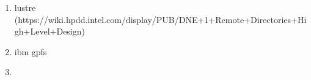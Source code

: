 \begin{enumerate}
    \item lustre (https://wiki.hpdd.intel.com/display/PUB/DNE+1+Remote+Directories+High+Level+Design)
    \item ibm gpfs
    \item 
\end{enumerate}
